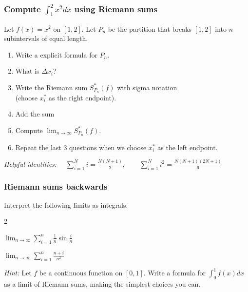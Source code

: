 \begin{frame}[t]
	\fontsize{13}{13}\selectfont
	\frametitle{Compute $\displaystyle \int_{1}^{2}\! x^{2}dx$ using Riemann sums}

	\begin{block}{}
		Let $\displaystyle f(x) = x^{2}$ on $[1,2]$. Let $P_{n}$ be the partition
		that breaks $[1,2]$ into $n$ subintervals of equal length.
		\begin{enumerate}
			\item Write a explicit formula for $P_{n}$.

			\item What is $\Delta x_{i}$?

			\item Write the Riemann sum $\displaystyle S^{*}_{P_n}(f)$ with sigma notation
				\\ (choose $x^{*}_{i}$ as the right endpoint).

			\item Add the sum

			\item Compute $\displaystyle \lim_{n \to \infty}S^{*}_{P_n}(f)$.

			\item Repeat the last 3 questions when we choose $x^{*}_{i}$ as the left endpoint.
		\end{enumerate}
	\end{block}
	{\fontsize{10}{10}\selectfont \emph{Helpful identities:} $\displaystyle \quad \sum_{i=1}^{N}i = \frac{N(N+1)}{2}, \quad \quad \sum_{i=1}^{N}i^{2}= \frac{N(N+1)(2N+1)}{6}$ }
\end{frame}

\begin{frame}[t]
	\frametitle{Riemann sums backwards}

	Interpret the following limits as integrals:
	\begin{enumerate}
	\end{enumerate}
	{\fontsize{10}{10}\selectfont \emph{Hint:} Let $f$ be a continuous function on $[0,1]$. Write a formula for $\displaystyle \int_{0}^{1}f(x) dx$ as a limit of Riemann sums, making the simplest choices you can. }
\end{frame}


